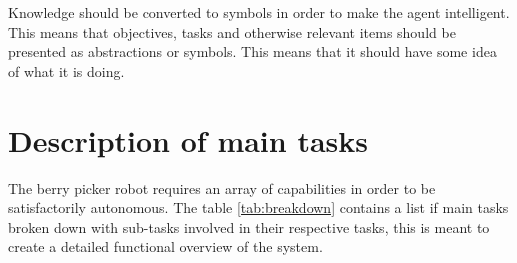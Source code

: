 \documentclass[%
oneside,    %
project,    %
nosummary   %
]{USN-MSc}
\begin{document}
Knowledge should be converted to symbols in order to make the agent intelligent. This means that objectives, tasks and otherwise relevant items should be presented as abstractions or symbols. This means that it should have some idea of what it is doing.

\section{Description of main tasks}

The berry picker robot requires an array of capabilities in order to be satisfactorily autonomous. The table \ref{tab:breakdown} contains a list if main tasks broken down with sub-tasks involved in their respective tasks, this is meant to create a detailed functional overview of the system.
\end{document}
